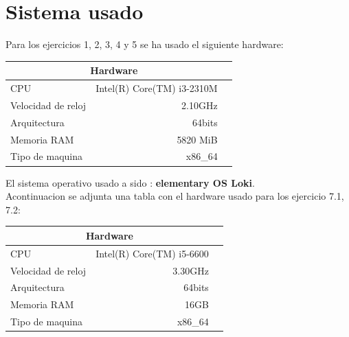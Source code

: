 \documentclass[12pt,a4psprt]{article}
\title{\fbox{\fbox{\bf Práctica 1: Eficiencia}}}
\author{Antonio Jesús Heredia Castillo\\ 2ºA \\ ETS de Ingenierías Informática y de Telecomunicación }
\date{\today}
\begin{document}
\maketitle{}
	
\begin{abstract}
En esta practica obtendremos datos sobre el tiempo de ejecucion de distintos algoritmos y como afecta la compilacion al tiempo de ejecución.
\end{abstract}



\pagebreak
\tableofcontents                %
\pagebreak
\section{Sistema usado}
Para los ejercicios 1, 2, 3, 4 y 5 se ha usado el siguiente hardware:
\begin{center}
\begin{tabular}{|l||r|p{2cm}}
\hline
\multicolumn{2}{|c|}{Hardware} \\
\hline
CPU & Intel(R) Core(TM) i3-2310M\\
\hline
Velocidad de reloj & 2.10GHz \\
\hline
Arquitectura & 64bits \\
\hline
Memoria RAM & 5820 MiB \\
\hline
Tipo de maquina & x86\_64 \\
\hline

\end{tabular}
\end{center}

El sistema operativo usado a sido : \textbf{elementary OS Loki}.\\

Acontinuacion se adjunta una tabla con el hardware usado para los ejercicio 7.1, 7.2: \\
\begin{center}
\begin{tabular}{|l||r|p{2cm}}
\hline
\multicolumn{2}{|c|}{Hardware} \\
\hline
CPU & Intel(R) Core(TM) i5-6600 \\
\hline
Velocidad de reloj & 3.30GHz \\
\hline
Arquitectura & 64bits \\
\hline
Memoria RAM & 16GB \\
\hline
Tipo de maquina & x86\_64 \\
\hline

\end{tabular}
\end{center}
\end{document}
